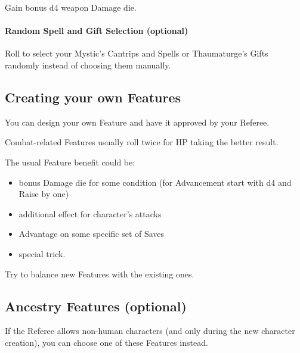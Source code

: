 \documentclass[itdr]{subfiles}
\begin{document}
\break

\featmt\feathp
Gain bonus d4 weapon Damage die.

\vspace{1ex}

\begin{dbox}
	\paragraph{Random Spell and Gift Selection (optional)}
	Roll to select your Mystic's Cantrips and Spells or Thaumaturge's Gifts  randomly instead of \mbox{choosing} them manually.
\end{dbox}

\vspace{-1ex}

\begin{dbox}
\subsection*{Creating your own Features}

You can design your own Feature and have it approved by your Referee.

Combat-related Features usually roll twice for HP taking the better result.

The usual Feature benefit could be:
\begin{itemize}
	\item bonus Damage die for some condition (for Advancement start with d4 and Raise by one)
	\item additional effect for character's attacks
	\item Advantage on some specific set of Saves
	\item special trick.
\end{itemize}

Try to balance new Features with the existing ones.\hspace{-0.6em}
\end{dbox}

\vfill
\subsection*{Ancestry Features (optional)}

If the Referee allows non-human characters (and only during the new character creation), you can choose one of these Features instead.
\end{document}
